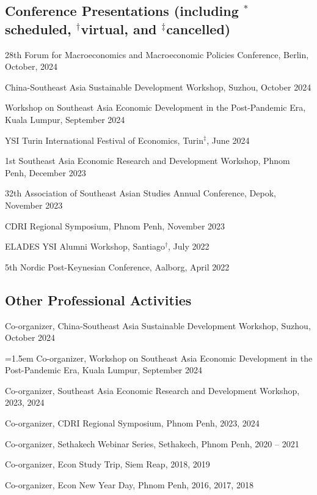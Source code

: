 \documentclass[10pt,a4paper]{article}
\begin{document}
\subsection*{Conference Presentations (including $^\ast$scheduled, $^\dag$virtual, and $^\ddag$cancelled)}

28th Forum for Macroeconomics and Macroeconomic Policies Conference, Berlin, October, 2024

China-Southeast Asia Sustainable Development Workshop, Suzhou, October 2024

Workshop on Southeast Asia Economic Development in the Post-Pandemic Era, Kuala Lumpur, September 2024

YSI Turin International Festival of Economics, Turin$^\ddag$, June 2024

1st Southeast Asia Economic Research and Development Workshop, Phnom Penh, December 2023

32th Association of Southeast Asian Studies Annual Conference, Depok, November 2023

CDRI Regional Symposium, Phnom Penh, November 2023

ELADES YSI Alumni Workshop, Santiago$^\dag$, July 2022

5th Nordic Post-Keynesian Conference, Aalborg, April 2022

\subsection*{Other Professional Activities}

	Co-organizer, China-Southeast Asia Sustainable Development Workshop, Suzhou, October 2024

	\hangindent=1.5em
	Co-organizer, Workshop on Southeast Asia Economic Development in the Post-Pandemic Era, Kuala Lumpur, September 2024

	Co-organizer, Southeast Asia Economic Research and Development Workshop, 2023, 2024
	
	Co-organizer, CDRI Regional Symposium, Phnom Penh, 2023, 2024
	
	Co-organizer, Sethakech Webinar Series, Sethakech, Phnom Penh, 2020 -- 2021

	Co-organizer, Econ Study Trip, Siem Reap, 2018, 2019

	Co-organizer, Econ New Year Day, Phnom Penh, 2016, 2017, 2018
\end{document}
